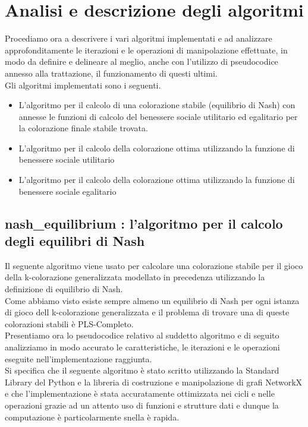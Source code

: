\section{Analisi e descrizione degli algoritmi}
\justify

Procediamo ora a descrivere i vari algoritmi implementati e ad analizzare approfonditamente le iterazioni e le operazioni di manipolazione effettuate, in modo da definire e delineare al meglio, anche con l'utilizzo di pseudocodice annesso alla trattazione, il funzionamento di questi ultimi.\\

Gli algoritmi implementati sono i seguenti.

\begin{itemize}
	\item L'algoritmo per il calcolo di una colorazione stabile (equilibrio di Nash) con annesse le funzioni di calcolo del benessere sociale utilitario ed egalitario per la colorazione finale stabile trovata.
	\item L'algoritmo per il calcolo della colorazione ottima utilizzando la funzione di benessere sociale utilitario 
	\item L'algoritmo per il calcolo della colorazione ottima utilizzando la funzione di benessere sociale egalitario 
\end{itemize}


\newpage
\subsection{nash\_equilibrium : l'algoritmo per il calcolo degli equilibri di Nash}
\justify
Il seguente algoritmo viene usato per calcolare una colorazione stabile per il gioco della k-colorazione generalizzata modellato in precedenza utilizzando la definizione di equilibrio di Nash.\\

Come abbiamo visto esiste sempre almeno un equilibrio di Nash per ogni istanza di gioco dell k-colorazione generalizzata e il problema di trovare una di queste colorazioni stabili è PLS-Completo.\\

Presentiamo ora lo pseudocodice relativo al suddetto algoritmo e di seguito analizziamo in modo accurato le caratteristiche, le iterazioni e le operazioni eseguite nell'implementazione raggiunta.\\

Si specifica che il seguente algoritmo è stato scritto utilizzando la Standard Library del Python e la libreria di costruzione e manipolazione di grafi NetworkX e che l'implementazione è stata accuratamente ottimizzata nei cicli e nelle operazioni grazie ad un attento uso di funzioni e strutture dati e dunque la computazione è particolarmente snella è rapida.\\


